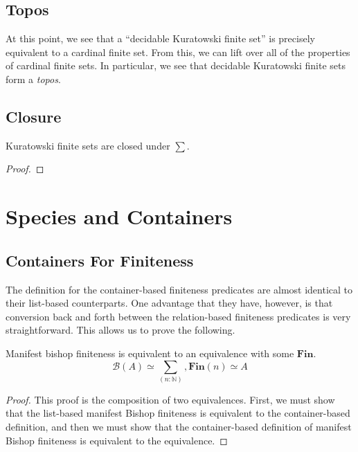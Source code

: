 \subsection{Topos}
At this point, we see that a ``decidable Kuratowski finite set'' is precisely
equivalent to a cardinal finite set.
From this, we can lift over all of the properties of cardinal finite sets.
In particular, we see that decidable Kuratowski finite sets form a \emph{topos}.
\subsection{Closure}
\begin{rm-theorem}
  Kuratowski finite sets are closed under \(\sum\).
\end{rm-theorem}
\begin{proof}
\end{proof}
\section{Species and Containers} \label{species-and-containers}
\subsection{Containers For Finiteness}
The definition for the container-based finiteness predicates are almost
identical to their list-based counterparts.
One advantage that they have, however, is that conversion back and forth between
the relation-based finiteness predicates is very straightforward.
This allows us to prove the following.
\begin{rm-theorem}
  Manifest bishop finiteness is equivalent to an equivalence with some \(\mathbf{Fin}\).
  \begin{equation}
    \mathcal{B}(A) \simeq \sum_{(n : \mathbb{N})} , \mathbf{Fin}(n) \simeq A
  \end{equation}
\end{rm-theorem}
\begin{proof}
  This proof is the composition of two equivalences.
  First, we must show that the list-based manifest Bishop finiteness is
  equivalent to the container-based definition, and then we must show that the
  container-based definition of manifest Bishop finiteness is equivalent to the
  equivalence.
\end{proof}

